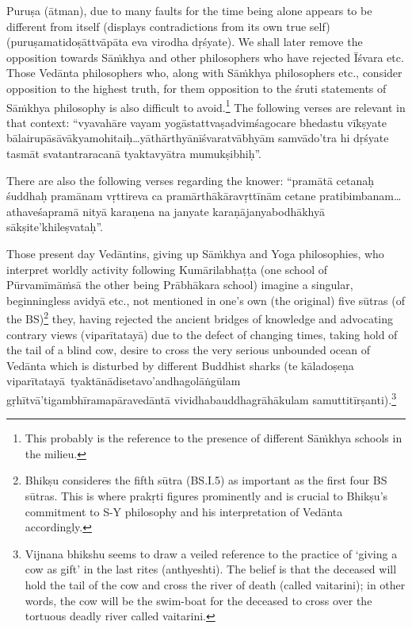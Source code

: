 Puruṣa (ātman), due to many faults for the time being alone appears to be different from itself (displays contradictions from its own true self) (puruṣamatidoṣāttvāpāta eva virodha dṛśyate). We shall later remove  the opposition towards Sāṁkhya and other philosophers who have rejected Īśvara etc. Those Vedānta philosophers who, along with Sāṁkhya philosophers etc., consider opposition to the highest truth, for them opposition to the śruti statements of Sāṁkhya philosophy is also difficult to avoid.\footnote{This probably is the reference to the presence of different Sāṁkhya schools in the milieu.} The following verses are relevant in that context: “vyavahāre vayam yogāstattvaṣadvimśagocare bhedastu vīkṣyate bālairupāsāvākyamohitaiḥ…yāthārthyānīśvaratvābhyām samvā\-\break\hbox{do’\-tra} hi dṛśyate tasmāt svatantraracanā tyaktavyātra mumukṣibhiḥ”.

There are also the following verses regarding the knower: “pramātā cetanaḥ śuddhaḥ pramānam vṛttireva ca pramārthākāravṛttīnām cetane pratibimbanam…athaveśapramā nityā karaṇena na janyate karaṇājanyabodhākhyā sākṣite’khileṣvataḥ”.

Those present day Vedāntins, giving up Sāṁkhya and Yoga philosophies, who interpret worldly activity following Kumārilabhaṭṭa (one school of Pūrvamīmāṁsā the other being Prābhākara school) imagine a singular, beginningless avidyā etc., not mentioned in one’s own (the original) five sūtras (of the BS)\footnote{Bhikṣu consideres the fifth sūtra (BS.I.5) as important as the first four BS sūtras. This is where prakṛti figures prominently and is crucial to Bhikṣu’s commitment to S-Y philosophy and his interpretation of Vedānta accordingly.} they, having rejected the ancient bridges of knowledge and advocating contrary views (viparītatayā) due to the defect of changing times, taking hold of the tail of a blind cow, desire to cross the very serious unbounded ocean of Vedānta which is disturbed by different Buddhist sharks (te kāladoṣeṇa  viparītatayā tya\-ktānādisetavo’andhagolāṅgūlam gṛhītvā’tigambhīramapāravedāntā\- vividhabauddhagrāhākulam samuttitīrṣanti).\footnote{Vijnana bhikshu seems to draw a veiled reference to the practice of ‘giving a cow as gift’ in the last rites (anthyeshti). The belief is that the deceased will hold the tail of the cow and cross the river of death (called vaitarini); in other words, the cow will be the swim-boat for the deceased to cross over the tortuous deadly river called vaitarini.}


